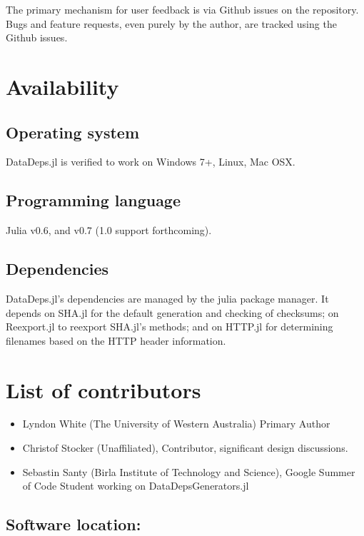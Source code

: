 \documentclass{book}
\begin{document}
The primary mechanism for user feedback is via Github issues on the repository.
Bugs and feature requests, even purely by the author, are tracked using the Github issues.


\section{Availability}
\subsection{Operating system}
DataDeps.jl is verified to work on Windows 7+, Linux, Mac OSX.

\subsection{Programming language}
Julia v0.6, and v0.7 (1.0 support forthcoming).

\subsection{Dependencies}
DataDeps.jl's dependencies are managed by the julia package manager.
It depends on SHA.jl for the default generation and checking of checksums; 
on Reexport.jl to reexport SHA.jl's methods;
and on HTTP.jl for determining filenames based on the HTTP header information.

\section*{List of contributors}
\begin{itemize}
	\item Lyndon White (The University of Western Australia) Primary Author
	\item Christof Stocker (Unaffiliated), Contributor, significant design discussions.
	\item Sebastin Santy (Birla Institute of Technology and Science), Google Summer of Code Student working on DataDepsGenerators.jl
	
\end{itemize}

\subsection{Software location:}
\end{document}
